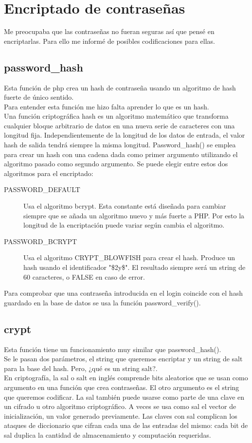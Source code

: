 \section{Encriptado de contraseñas}
Me preocupaba que las contraseñas no fueran seguras así que pensé en encriptarlas. Para ello me informé de posibles codificaciones para ellas.
\subsection{password\_hash}
Esta función de php crea un hash de contraseña usando un algoritmo de hash fuerte de único sentido.\\
Para entender esta función me hizo falta aprender lo que es un hash.\\
Una función criptográfica hash es un algoritmo matemático que transforma cualquier bloque arbitrario de datos en una nueva serie de caracteres con una longitud fija. Independientemente de la longitud de los datos de entrada, el valor hash de salida tendrá siempre la misma longitud.\cite{definicionHash}
Password\_hash() se emplea para crear un hash con una cadena dada como primer argumento utilizando el algoritmo pasado como segundo argumento. 
Se puede elegir entre estos dos algoritmos para el encriptado:
\begin{description}
    \item [PASSWORD\_DEFAULT] Usa el algoritmo bcrypt. Esta constante está diseñada para cambiar siempre que se añada un algoritmo nuevo y más fuerte a PHP. Por esto la longitud de la encriptación puede variar según cambia el algoritmo.
    \item [PASSWORD\_BCRYPT] Usa el algoritmo CRYPT\_BLOWFISH para crear el hash. Produce un hash usando el identificador "\$2y\$". El resultado siempre será un string de 60 caracteres, o FALSE en caso de error.
\end{description}
Para comprobar que una contraseña introducida en el login coincide con el hash guardado en la base de datos se usa la función password\_verify().\cite{passwordHash}
\subsection{crypt}
Esta función tiene un funcionamiento muy similar que password\_hash().\\
Se le pasan dos parámetros, el string que queremos encriptar y un string de salt para la base del hash.\cite{crypt} Pero, ¿qué es un string salt?.\\
En criptografía, la sal o salt en inglés comprende bits aleatorios que se usan como argumento en una función que crea contraseñas. El otro argumento es el string que queremos codificar. La sal también puede usarse como parte de una clave en un cifrado u otro algoritmo criptográfico. A veces se usa como sal el vector de inicialización, un valor generado previamente.
Las claves con sal complican los ataques de diccionario que cifran cada una de las entradas del mismo: cada bit de sal duplica la cantidad de almacenamiento y computación requeridas.\cite{salt}
